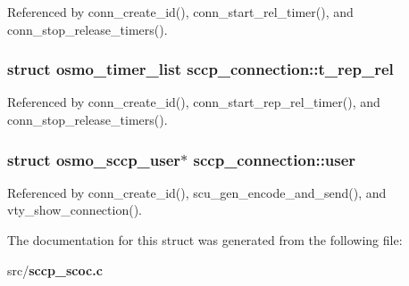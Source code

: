 Referenced by conn\+\_\+create\+\_\+id(), conn\+\_\+start\+\_\+rel\+\_\+timer(), and conn\+\_\+stop\+\_\+release\+\_\+timers().

\subsubsection[{t\+\_\+rep\+\_\+rel}]{\setlength{\rightskip}{0pt plus 5cm}struct osmo\+\_\+timer\+\_\+list sccp\+\_\+connection\+::t\+\_\+rep\+\_\+rel}\label{structsccp__connection_a95d41a0f9d38d64c5309eb2507d82ed5}


Referenced by conn\+\_\+create\+\_\+id(), conn\+\_\+start\+\_\+rep\+\_\+rel\+\_\+timer(), and conn\+\_\+stop\+\_\+release\+\_\+timers().

\subsubsection[{user}]{\setlength{\rightskip}{0pt plus 5cm}struct {\bf osmo\+\_\+sccp\+\_\+user}$\ast$ sccp\+\_\+connection\+::user}\label{structsccp__connection_a067a391c7bd5c77ebf9f79cee339a928}


Referenced by conn\+\_\+create\+\_\+id(), scu\+\_\+gen\+\_\+encode\+\_\+and\+\_\+send(), and vty\+\_\+show\+\_\+connection().



The documentation for this struct was generated from the following file\+:\begin{DoxyCompactItemize}
\item 
src/{\bf sccp\+\_\+scoc.\+c}\end{DoxyCompactItemize}
